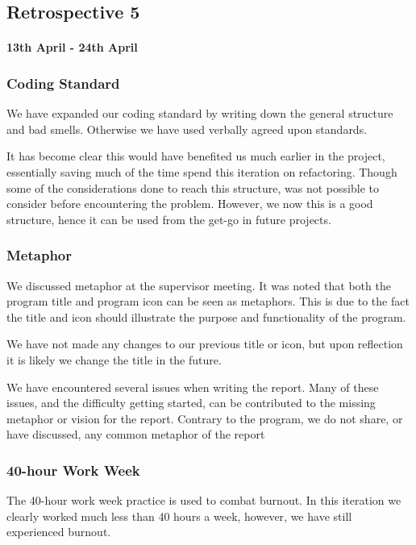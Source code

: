\subsection*{Retrospective 5}
\paragraph{13th April - 24th April}

\subsubsection{Coding Standard}
We have expanded our coding standard by writing down the general structure and bad smells. Otherwise we have used verbally agreed upon standards.

It has become clear this would have benefited us much earlier in the project, essentially saving much of the time spend this iteration on refactoring. Though some of the considerations done to reach this structure, was not possible to consider before encountering the problem.
However, we now this is a good structure, hence it can be used from the get-go in future projects. 


\subsubsection{Metaphor}
We discussed metaphor at the supervisor meeting. It was noted that both the program title and program icon can be seen as metaphors. This is due to the fact the title and icon should illustrate the purpose and functionality of the program.

We have not made any changes to our previous title or icon, but upon reflection it is likely we change the title in the future.

We have encountered several issues when writing the report. Many of these issues, and the difficulty getting started, can be contributed to the missing metaphor or vision for the report. Contrary to the program, we do not share, or have discussed, any common metaphor of the report

\subsubsection{40-hour Work Week}

The 40-hour work week practice is used to combat burnout.
In this iteration we clearly worked much less than 40 hours a week, however, we have still experienced burnout.

